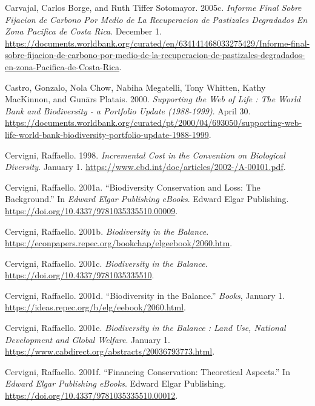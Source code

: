 \begin{CSLReferences}{1}{1}
Carvajal, Carlos Borge, and Ruth Tiffer Sotomayor. 2005c. \emph{Informe
Final Sobre Fijacion de Carbono Por Medio de La Recuperacion de
Pastizales Degradados En Zona Pacifica de Costa Rica}. December 1.
\url{https://documents.worldbank.org/curated/en/634141468033275429/Informe-final-sobre-fijacion-de-carbono-por-medio-de-la-recuperacion-de-pastizales-degradados-en-zona-Pacifica-de-Costa-Rica}.

Castro, Gonzalo, Nola Chow, Nabiha Megatelli, Tony Whitten, Kathy
MacKinnon, and Gunārs Platais. 2000. \emph{Supporting the Web of Life :
The World Bank and Biodiversity - a Portfolio Update (1988-1999)}. April
30.
\url{https://documents.worldbank.org/curated/pt/2000/04/693050/supporting-web-life-world-bank-biodiversity-portfolio-update-1988-1999}.

Cervigni, Raffaello. 1998. \emph{Incremental Cost in the Convention on
Biological Diversity}. January 1.
\url{https://www.cbd.int/doc/articles/2002-/A-00101.pdf}.

Cervigni, Raffaello. 2001a. {``Biodiversity Conservation and Loss: The
Background.''} In \emph{Edward Elgar Publishing eBooks}. Edward Elgar
Publishing. \url{https://doi.org/10.4337/9781035335510.00009}.

Cervigni, Raffaello. 2001b. \emph{Biodiversity in the Balance}.
\url{https://econpapers.repec.org/bookchap/elgeebook/2060.htm}.

Cervigni, Raffaello. 2001c. \emph{Biodiversity in the Balance}.
\url{https://doi.org/10.4337/9781035335510}.

Cervigni, Raffaello. 2001d. {``Biodiversity in the Balance.''}
\emph{Books}, January 1.
\url{https://ideas.repec.org/b/elg/eebook/2060.html}.

Cervigni, Raffaello. 2001e. \emph{Biodiversity in the Balance : Land
Use, National Development and Global Welfare}. January 1.
\url{https://www.cabdirect.org/abstracts/20036793773.html}.

Cervigni, Raffaello. 2001f. {``Financing Conservation: Theoretical
Aspects.''} In \emph{Edward Elgar Publishing eBooks}. Edward Elgar
Publishing. \url{https://doi.org/10.4337/9781035335510.00012}.


\end{CSLReferences}
